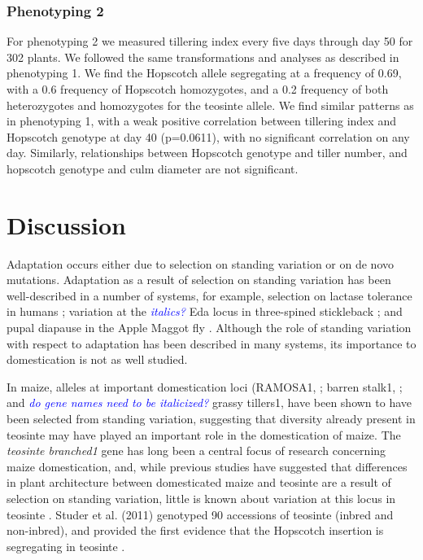 \documentclass[12pt]{article}
\newcommand{\jri}[1]{\textcolor{blue}{ \emph{\scriptsize  #1}} }
\begin{document}
\subsubsection*{Phenotyping 2}

For phenotyping 2 we measured tillering index every five days through day 50 for 302 plants. We followed the same transformations and analyses as described in phenotyping 1. We find the Hopscotch allele segregating at a frequency of 0.69, with a 0.6 frequency of Hopscotch homozygotes, and a 0.2 frequency of both heterozygotes and homozygotes for the teosinte allele. We find similar patterns as in phenotyping 1, with a weak positive correlation between tillering index and Hopscotch genotype at day 40 (p=0.0611), with no significant correlation on any day. Similarly, relationships between Hopscotch genotype and tiller number, and hopscotch genotype and culm diameter are not significant. 


\section*{Discussion}

Adaptation occurs either due to selection on standing variation or on de novo mutations. Adaptation as a result of selection on standing variation has been well-described in a number of systems, for example, selection on lactase tolerance in humans \cite{Plantinga et al 2012, Tishkoff et al 2007}; variation at the \jri{italics?} Eda locus in three-spined stickleback \cite{Kitano et al 2008, Colosimo et al 2005}; and pupal diapause in the Apple Maggot fly \cite{Feder et al 2003}. Although the role of standing variation with respect to adaptation has been described in many systems, its importance to domestication is not as well studied. 

In maize, alleles at important domestication loci (RAMOSA1, \cite{Sigmon and Vollbrecht 2010}; barren stalk1, \cite{Gallavotti et al 2004}; and \jri{do gene names need to be italicized?} grassy tillers1, \cite{Whipple et al 2011} have been shown to have been selected from standing variation, suggesting that diversity already present in teosinte may have played an important role in the domestication of maize. The \emph{teosinte branched1} gene has long been a central focus of research concerning maize domestication, and, while previous studies have suggested that differences in plant architecture between domesticated maize and teosinte are a result of selection on standing variation, little is known about variation at this locus in teosinte \cite{Clark et al 2006, Studer et al 2011}. Studer et al. (2011) genotyped 90 accessions of teosinte (inbred and non-inbred), and provided the first evidence that the Hopscotch insertion is segregating in teosinte \cite{Studer et al 2011}. 
\end{document}
